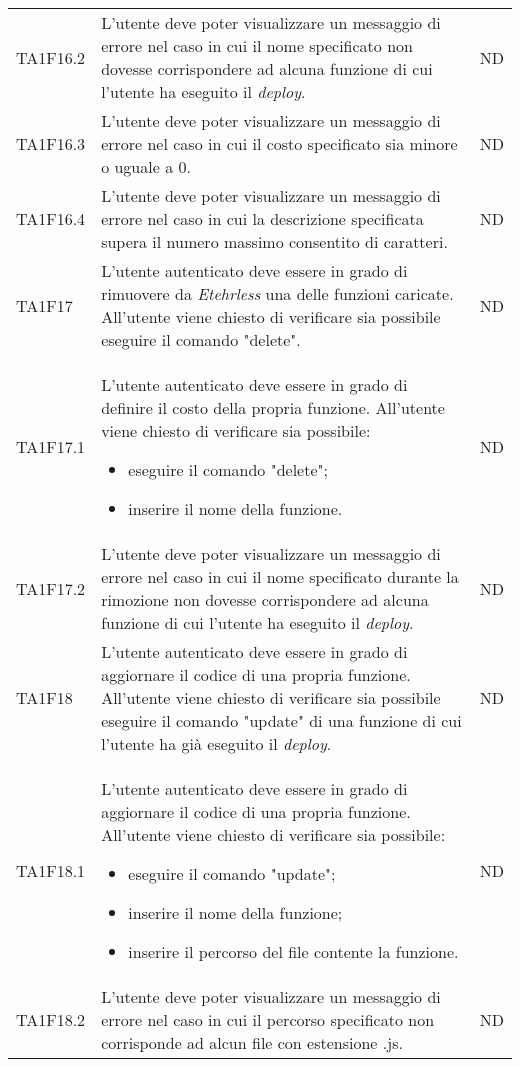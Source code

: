 \begin{longtable}{|C{1.5cm}|C{10cm}|C{1.5cm}|}
	TA1F16.2  &
	L’utente deve poter visualizzare un messaggio di errore nel caso in cui il nome specificato non dovesse corrispondere ad alcuna funzione di cui l'utente ha eseguito il \textit{deploy\glos}. &
	ND \\

	TA1F16.3  &
	L’utente deve poter visualizzare un messaggio di errore nel caso in cui il costo specificato sia minore o uguale a 0. &
	ND \\

	TA1F16.4  &
	L’utente deve poter visualizzare un messaggio di errore nel caso in cui la descrizione specificata supera il numero massimo consentito di caratteri. &
	ND \\

	TA1F17  &
	L'utente autenticato deve essere in grado di rimuovere da \textit{Etehrless} una delle funzioni caricate. All’utente viene chiesto di verificare sia possibile eseguire il comando "delete". &
	ND \\

	TA1F17.1  &
	L'utente autenticato deve essere in grado di definire il costo della propria funzione. All’utente viene chiesto di verificare sia possibile:
	\begin{itemize}
		\item eseguire il comando "delete";
		\item inserire il nome della funzione.
	\end{itemize} &
	ND \\[-5ex]

	TA1F17.2  &
	L’utente deve poter visualizzare un messaggio di errore nel caso in cui il nome specificato durante la rimozione non dovesse corrispondere ad alcuna funzione di cui l'utente ha eseguito il \textit{deploy\glos}. &
	ND \\

	TA1F18  &
	L'utente autenticato deve essere in grado di aggiornare il codice di una propria funzione. All’utente viene chiesto di verificare sia possibile eseguire il comando "update" di una funzione di cui l'utente ha già eseguito il \textit{deploy\glos}. &
	ND \\

	TA1F18.1  &
	L'utente autenticato deve essere in grado di aggiornare il codice di una propria funzione. All’utente viene chiesto di verificare sia possibile:
	\begin{itemize}
		\item eseguire il comando "update";
		\item inserire il nome della funzione;
		\item inserire il percorso del file contente la funzione.
	\end{itemize} &
	ND \\[-5ex]

	TA1F18.2  &
	L’utente deve poter visualizzare un messaggio di errore nel caso in cui il percorso specificato non corrisponde ad alcun file con estensione .js. &
	ND \\
\end{longtable}


